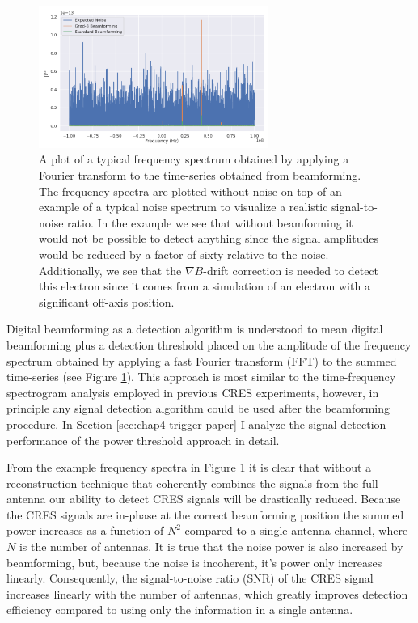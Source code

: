 \begin{figure}[htbp]
    \centering
    \includegraphics[width=0.67\textwidth]{figs/Chapter-4/220304_example_power_spectrum_gradb_vs_noise_vs_standard_bf.png}
    \caption{A plot of a typical frequency spectrum obtained by applying a Fourier transform to the time-series obtained from beamforming. The frequency spectra are plotted without noise on top of an example of a typical noise spectrum to visualize a realistic signal-to-noise ratio. In the example we see that without beamforming it would not be possible to detect anything since the signal amplitudes would be reduced by a factor of sixty relative to the noise. Additionally, we see that the $\nabla B$-drift correction is needed to detect this electron since it comes from a simulation of an electron with a significant off-axis position. }
    \label{fig:chap4-bf-signal-example}
\end{figure}

Digital beamforming as a detection algorithm is understood to mean digital beamforming plus a detection threshold placed on the amplitude of the frequency spectrum obtained by applying a fast Fourier transform (FFT) to the summed time-series (see Figure \ref{fig:chap4-bf-signal-example}). This approach is most similar to the time-frequency spectrogram analysis employed in previous CRES experiments, however, in principle any signal detection algorithm could be used after the beamforming procedure. In Section \ref{sec:chap4-trigger-paper} I analyze the signal detection performance of the power threshold approach in detail.

From the example frequency spectra in Figure \ref{fig:chap4-bf-signal-example} it is clear that without a reconstruction technique that coherently combines the signals from the full antenna our ability to detect CRES signals will be drastically reduced. Because the CRES signals are in-phase at the correct beamforming position the summed power increases as a function of $N^2$ compared to a single antenna channel, where $N$ is the number of antennas. It is true that the noise power is also increased by beamforming, but, because the noise is incoherent, it's power only increases linearly. Consequently, the signal-to-noise ratio (SNR) of the CRES signal increases linearly with the number of antennas, which greatly improves detection efficiency compared to using only the information in a single antenna.

